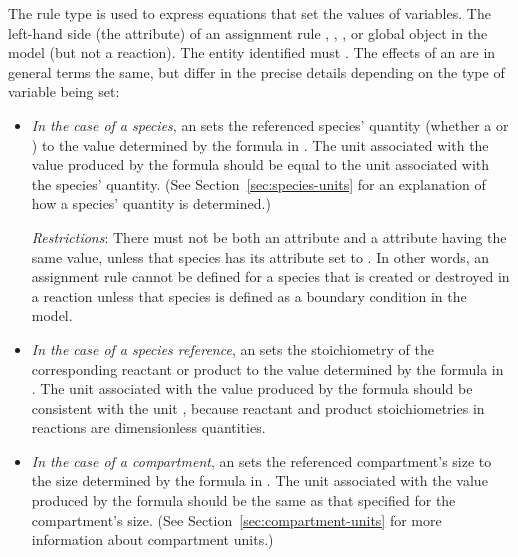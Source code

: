 The rule type \AssignmentRule is used to express equations that
set the values of variables.  The left-hand side (the 
 attribute) of an assignment rule 
\Species, \SpeciesReference, \Compartment, 
or global \Parameter object in
the model (but not a reaction).  The entity identified must
.  The effects of
an \AssignmentRule are in general terms the same, but differ in
the precise details depending on the type of variable being set:

\begin{itemize}
  
\item \emph{In the case of a species}, an \AssignmentRule sets the
  referenced species' quantity (whether a 
  or ) to the value determined by the formula in
  .  The unit associated with the value produced by
  the  formula should be equal to the unit associated
  with the species' quantity.  (See
  Section~\ref{sec:species-units} for an explanation of how a
  species' quantity is determined.)
  
  \emph{Restrictions}: There must not be both an \AssignmentRule
   attribute and a \SpeciesReference {}
  attribute having the same value, unless that species has its
   attribute set to .  In other
  words, an assignment rule cannot be defined for a species that
  is created or destroyed in a reaction unless that species is
  defined as a boundary condition in the model.

\item \emph{In the case of a species reference}, an
  \AssignmentRule sets the stoichiometry of the corresponding
  reactant or product to the value determined by the formula in
  .  The unit associated with the value produced by
  the  formula should be consistent with the unit
  , because reactant and product
  stoichiometries in reactions are dimensionless quantities.

\item \emph{In the case of a compartment}, an \AssignmentRule sets
  the referenced compartment's size to the size determined by the
  formula in .  The unit associated with the value
  produced by the  formula should be the same as that
  specified for the compartment's size.  (See
  Section~\ref{sec:compartment-units} for more information about
  compartment units.)
  

\end{itemize}
